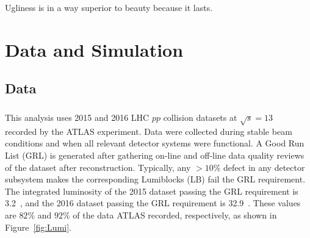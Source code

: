 \begin{savequote}[75mm]
Ugliness is in a way superior to beauty because it lasts.
\end{savequote}
\chapter{Data and Simulation}
%

\section{Data}
\label{sec:data}
\paragraph{}
This analysis uses 2015 and 2016 LHC $pp$ collision datasets at $\sqrt{s} = 13$~\TeV~ recorded by the ATLAS experiment. 
Data were collected during stable beam conditions and when all relevant detector systems were functional. 
A Good Run List (GRL) is generated after gathering on-line and off-line data quality reviews of the dataset after reconstruction. 
Typically, any $> 10\%$ defect in any detector subsystem makes the corresponding Lumiblocks (LB) fail the GRL requirement. 
The integrated luminosity of the 2015 dataset passing the GRL requirement is 3.2~\ifb, and the 2016 dataset passing the GRL requirement is 32.9~\ifb. 
These values are $82\%$ and $92\%$ of the data ATLAS recorded, respectively, as shown in Figure~\ref{fig:Lumi}.

